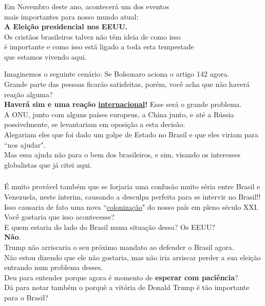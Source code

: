 \documentclass[aspectratio=169]{beamer}
\begin{document}
	
\begin{frame}
	  \frametitle{}
	  \framesubtitle{}
	    \centering
	    \large
		Em Novembro deste ano, acontecerá um dos eventos\\
		 mais importantes para nosso mundo atual:\\
		\textbf{A Eleição presidencial nos EEUU.} \\
		\vspace{.5cm}
		Os cristãos brasileiros talvez não têm ideia de como isso \\
		é importante e como isso está ligado a toda esta tempestade \\
		que estamos vivendo aqui. \\
	\end{frame}


\begin{frame}
  \centering
  \large
  	Imaginemos o seguinte cenário: Se Bolsonaro aciona o artigo 142 agora. \\
  	Grande parte das pessoas ficarão satisfeitas, porém, você acha que não haverá reação alguma?\\
  	\textbf{Haverá sim e uma reação \underline{internacional}!} Esse será o grande problema. \\
	\vspace{.5cm}
	A ONU, junto com alguns países europeus, a China junto, e até a Rússia possivelmente, se levantariam em oposição a esta decisão.\\ Alegariam eles que foi dado um golpe de Estado no Brasil e que eles viriam para ``nos ajudar".\\
	Mas essa ajuda não para o bem dos brasileiros, e sim, visando os interesses globalistas que já citei aqui.\\
\end{frame}


\begin{frame}
	  \frametitle{}
	  \framesubtitle{}
	    \centering
	  	É muito provável também que se forjaria uma confusão muito séria entre Brasil e Venezuela, neste ínterim, causando a desculpa perfeita para se intervir no Brasil!! \\
	  	Isso causaria de fato uma nova ``\underline{colonização}" do nosso país em pleno século XXI. Você gostaria que isso acontecesse?\\
		\vspace{.5cm}
		E quem estaria do lado do Brasil numa situação dessa? Os EEUU?\\ 
		\textbf{Não}.\\
		Trump não arriscaria o seu próximo mandato ao defender o Brasil agora. \\
	  Não estou dizendo que ele não gostaria, mas não iria arriscar perder a sua eleição entrando num problema desses.\\
	Deu para entender porque agora é momento de \textbf{esperar com paciência}?\\
	Dá para notar também o porquê a vitória de Donald Trump é tão importante para o Brasil?
	\end{frame}
	
\end{document}
